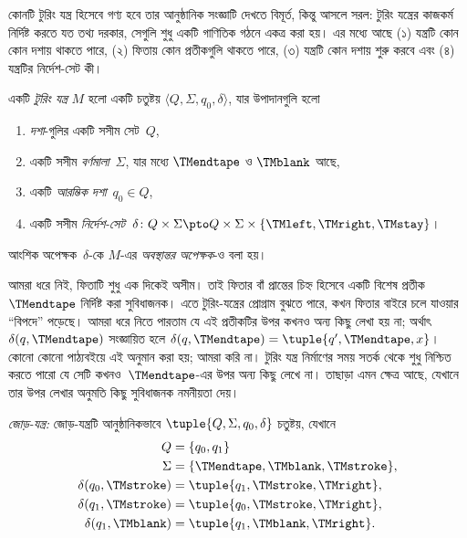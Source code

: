 \documentclass[../../../include/open-logic-section]{subfiles}
\begin{document}

\begin{explain}
কোনটি টুরিং যন্ত্র হিসেবে গণ্য হবে তার আনুষ্ঠানিক সংজ্ঞাটি দেখতে বিমূর্ত,
কিন্তু আসলে সরল: টুরিং যন্ত্রের কাজকর্ম নির্দিষ্ট করতে যত তথ্য দরকার,
সেগুলি শুধু একটি গাণিতিক গঠনে একত্র করা হয়। এর মধ্যে আছে (১) যন্ত্রটি
কোন কোন দশায় থাকতে পারে, (২) ফিতায় কোন প্রতীকগুলি থাকতে পারে, (৩)
যন্ত্রটি কোন দশায় শুরু করবে এবং (৪) যন্ত্রটির নির্দেশ-সেট কী।
\end{explain}

\begin{defn}[টুরিং যন্ত্র]
একটি \emph{টুরিং যন্ত্র} $M$ হলো একটি চতুষ্টয় $\langle Q, \Sigma, q_0,
\delta\rangle$, যার উপাদানগুলি হলো
\begin{enumerate}
\item \emph{দশা}-গুলির একটি সসীম সেট~$Q$,
\item একটি সসীম \emph{বর্ণমালা}~$\Sigma$, যার মধ্যে $\TMendtape$ ও
  $\TMblank$ আছে,
\item একটি \emph{আরম্ভিক দশা}~$q_0 \in Q$,
\item একটি সসীম \emph{নির্দেশ-সেট}~$\delta\colon Q \times \Sigma
  \pto Q \times \Sigma \times \{\TMleft, \TMright, \TMstay\}$।
\end{enumerate}
আংশিক অপেক্ষক~$\delta$-কে $M$-এর \emph{অবস্থান্তর অপেক্ষক}-ও বলা হয়।
\end{defn}

\begin{explain}
আমরা ধরে নিই, ফিতাটি শুধু এক দিকেই অসীম। তাই ফিতার বাঁ প্রান্তের চিহ্ন
হিসেবে একটি বিশেষ প্রতীক~$\TMendtape$ নির্দিষ্ট করা সুবিধাজনক। এতে
টুরিং-যন্ত্রের প্রোগ্রাম বুঝতে পারে, কখন ফিতার বাইরে চলে যাওয়ার “বিপদে”
পড়েছে। আমরা ধরে নিতে পারতাম যে এই প্রতীকটির উপর কখনও অন্য কিছু লেখা
হয় না; অর্থাৎ $\delta(q,\TMendtape)$ সংজ্ঞায়িত হলে
$\delta(q,\TMendtape) = \tuple{q', \TMendtape, x}$। কোনো কোনো পাঠ্যবইয়ে
এই অনুমান করা হয়; আমরা করি না। টুরিং যন্ত্র নির্মাণের সময় সতর্ক থেকে
শুধু নিশ্চিত করতে পারো যে সেটি কখনও~$\TMendtape$-এর উপর অন্য কিছু লেখে
না। তাছাড়া এমন ক্ষেত্র আছে, যেখানে তার উপর লেখার অনুমতি কিছু সুবিধাজনক
নমনীয়তা দেয়।
\end{explain}

\begin{ex}
\emph{জোড়-যন্ত্র:} জোড়-যন্ত্রটি আনুষ্ঠানিকভাবে
$\tuple{Q, \Sigma, q_0, \delta}$ চতুষ্টয়, যেখানে
\begin{align*}
Q & = \{ q_0, q_1 \} \\
\Sigma & = \{ \TMendtape, \TMblank, \TMstroke \}, \\
\delta(q_0, \TMstroke) & = \tuple{q_1, \TMstroke, \TMright},\\
\delta(q_1, \TMstroke) & = \tuple{q_0, \TMstroke, \TMright},\\
\delta(q_1, \TMblank)  & = \tuple{q_1, \TMblank, \TMright}.
\end{align*}
\end{ex}
\end{document}

